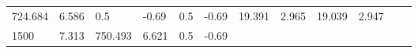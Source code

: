 \documentclass{article}
\begin{document}
\begin{longtable}[]{@{}llllllllllll@{}}
\begin{minipage}[t]{0.06\columnwidth}
724.684\strut
\end{minipage} & \begin{minipage}[t]{0.08\columnwidth}\raggedright\strut
6.586\strut
\end{minipage} & \begin{minipage}[t]{0.03\columnwidth}\raggedright\strut
0.5\strut
\end{minipage} & \begin{minipage}[t]{0.06\columnwidth}\raggedright\strut
-0.69\strut
\end{minipage} & \begin{minipage}[t]{0.03\columnwidth}\raggedright\strut
0.5\strut
\end{minipage} & \begin{minipage}[t]{0.06\columnwidth}\raggedright\strut
-0.69\strut
\end{minipage} & \begin{minipage}[t]{0.06\columnwidth}\raggedright\strut
19.391\strut
\end{minipage} & \begin{minipage}[t]{0.08\columnwidth}\raggedright\strut
2.965\strut
\end{minipage} & \begin{minipage}[t]{0.06\columnwidth}\raggedright\strut
19.039\strut
\end{minipage} & \begin{minipage}[t]{0.09\columnwidth}\raggedright\strut
2.947\strut
\end{minipage}\tabularnewline
\begin{minipage}[t]{0.03\columnwidth}\raggedright\strut
1500\strut
\end{minipage} & \begin{minipage}[t]{0.06\columnwidth}\raggedright\strut
7.313\strut
\end{minipage} & \begin{minipage}[t]{0.06\columnwidth}\raggedright\strut
750.493\strut
\end{minipage} & \begin{minipage}[t]{0.08\columnwidth}\raggedright\strut
6.621\strut
\end{minipage} & \begin{minipage}[t]{0.03\columnwidth}\raggedright\strut
0.5\strut
\end{minipage} & \begin{minipage}[t]{0.06\columnwidth}\raggedright\strut
-0.69\strut
\end{minipage} & \begin{minipage}[t]{0.03\columnwidth}\raggedright\strut

\end{minipage}
\end{longtable}
\end{document}
